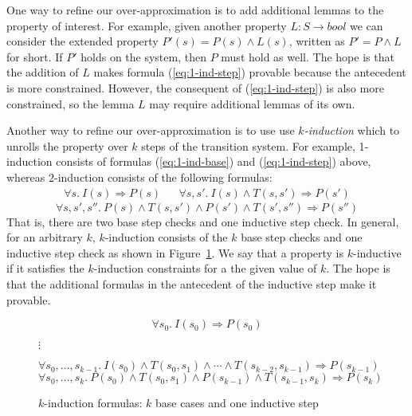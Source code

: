 One way to refine our over-approximation is to add additional lemmas
to the property of interest. For example, given another property $L :
S \to bool$ we can consider the extended property $P'(s) = P(s) \land
L(s)$, written as $P' = P \land L$ for short. If $P'$ holds on the
system, then $P$ must hold as well. The hope is that the addition of
$L$ makes formula (\ref{eq:1-ind-step}) provable because the
antecedent is more constrained. However, the consequent of
(\ref{eq:1-ind-step}) is also more constrained, so the lemma $L$ may
require additional lemmas of its own.

Another way to refine our over-approximation is to use use {\em
  $k$-induction} which to unrolls the property over $k$ steps of the
transition system. For example, 1-induction consists of formulas
(\ref{eq:1-ind-base}) and (\ref{eq:1-ind-step}) above, whereas
2-induction consists of the following formulas:
\begin{align*}
  \forall s.~ I(s) \Rightarrow P(s)
&&  \forall s, s'.~ I(s) \land T(s, s') \Rightarrow P(s')
\end{align*}
\begin{equation*}
  \forall s, s', s''.~ P(s) \land T(s, s') \land P(s') \land T(s', s'')  \Rightarrow P(s'')
\end{equation*}
That is, there are two base step checks and one inductive step check.
In general, for an arbitrary $k$, $k$-induction consists of the $k$
base step checks and one inductive step check as shown in
Figure~\ref{fig:k-induction}. We say that a property is $k$-inductive
if it satisfies the $k$-induction constraints for a the given value of
$k$. The hope is that the additional formulas in the antecedent of
the inductive step make it provable.

\begin{figure}
\begin{equation*}
  \forall s_0.~ I(s_0) \Rightarrow P(s_0)
\end{equation*}
\begin{center}
$\vdots$
\end{center}
\begin{equation*}
  \forall s_0, \ldots, s_{k-1}.~ I(s_0) \land T(s_0, s_1) \land \cdots
  \land T(s_{k-2}, s_{k-1}) \Rightarrow P(s_{k-1})
\end{equation*}
\begin{equation*}
  \forall s_0, \ldots, s_k.~ P(s_0) \land T(s_0, s_1) \land P(s_{k-1})
  \land T(s_{k-1}, s_k) \Rightarrow P(s_k)
\end{equation*}
\caption{$k$-induction formulas: $k$ base cases and one inductive
  step}
\label{fig:k-induction}
\end{figure}

